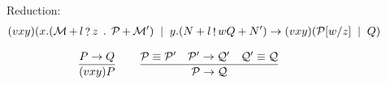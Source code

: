 \begin{figure}[h!]
  Reduction:
    \begin{align*}
      (vxy)(x . (\mathcal{M} \mathop + l \mathop?z \;\, . \;\, \mathcal{P} \mathop + \mathcal{M}') \;\mid\;
      y . (N + l \mathop!w Q + N') \rightarrow
      (vxy)({\mathcal{P}}[{w}/{z}] \;\mid\; Q)
    \end{align*}
    
    \begin{equation*}
      \frac{P \rightarrow Q}{(vxy)P}\qquad
      \frac{\mathcal{P}\equiv\mathcal{P'}\quad\mathcal{P'}\rightarrow\mathcal{Q'}\quad\mathcal{Q'}\equiv\mathcal{Q}}{\mathcal{P}\rightarrow\mathcal{Q}}
    \end{equation*}
\end{figure}


